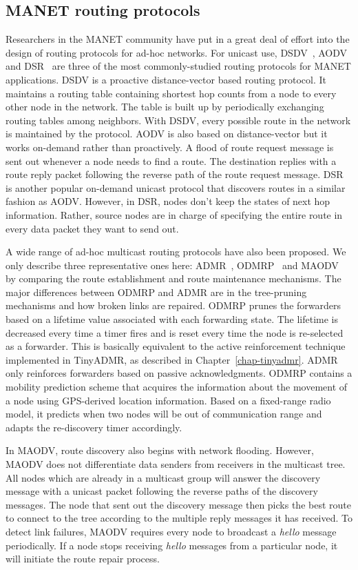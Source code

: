 \subsection{MANET routing protocols}

Researchers in the MANET community have put in a great deal of effort into
the design of routing protocols for ad-hoc networks. For unicast use, 
DSDV~\cite{dsdv}, AODV~\cite{aodv} and DSR~\cite{dsr} are 
three of the most commonly-studied routing protocols for MANET 
applications. DSDV is a proactive distance-vector based routing 
protocol. It maintains a routing table containing shortest hop 
counts from a node to every other node in the network. The table 
is built up by periodically exchanging routing tables among 
neighbors. With DSDV, every possible route in the network is maintained 
by the protocol. AODV is also based on distance-vector but it works 
on-demand rather than proactively. A flood of route request 
message is sent out whenever a node needs to find a route. The 
destination replies with a route reply packet following the 
reverse path of the route request message. DSR is another popular
on-demand unicast protocol that discovers routes in a similar
fashion as AODV. However, in DSR, nodes don't keep the states
of next hop information. Rather, source nodes are in charge of specifying
the entire route in every data packet they want to send out.

A wide range of ad-hoc multicast routing protocols have also been 
proposed.  We only describe three representative ones here: ADMR~\cite{admr},
ODMRP~\cite{odmrp} and MAODV~\cite{maodv} by comparing the route establishment
and route maintenance mechanisms.
The major differences between ODMRP and ADMR are in the
tree-pruning mechanisms and how broken links are repaired. 
ODMRP prunes the forwarders
based on a lifetime value associated with each forwarding state.
The lifetime is decreased every time a timer fires and is reset
every time the node is re-selected as a forwarder. This is 
basically equivalent to the active reinforcement technique
implemented in TinyADMR, as described in Chapter~\ref{chap-tinyadmr}. ADMR only reinforces forwarders based on 
passive acknowledgments. ODMRP contains a mobility
prediction scheme that acquires the information about the movement 
of a node using GPS-derived location information. 
Based on a fixed-range radio model, it predicts when two nodes 
will be out of communication range and adapts the re-discovery timer accordingly. 

In MAODV, route discovery also begins with network flooding.
However, MAODV does not differentiate data senders from 
receivers in the multicast tree. All nodes which are already in a 
multicast group will answer the discovery message with a unicast
packet following the reverse paths of the discovery messages. 
The node that sent out the discovery message then picks the best
route to connect to the tree according to the multiple reply
messages it has received. To detect link failures, MAODV requires
every node to broadcast a {\em hello} message periodically. If a node
stops receiving {\em hello} messages from a particular node, it will
initiate the route repair process.


